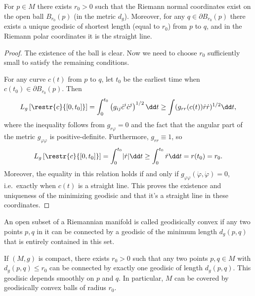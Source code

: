 \begin{cor}
    For $p\in M$ there exists $r_0>0$ such that the Riemann normal coordinates exist on the open ball $B_{r_0}(p)$ (in the metric $d_g$). Moreover, for any $q\in \partial B_{r_0}(p)$ there exists a unique geodisic of shortest length (equal to $r_0$) from $p$ to $q$, and in the Riemann polar coordinates it is the straight line.
\end{cor}
\begin{proof}
    The existence of the ball is clear. Now we need to choose $r_0$ sufficiently small to satisfy the remaining conditions.
    
    For any curve $c(t)$ from $p$ to $q$, let $t_0$ be the earliest time when $c(t_0)\in \partial B_{r_0}(p)$. Then
    \[L_g\left[\restr{c}{[0,t_0]}\right]=\int_0^{t_0} \left(g_{ij}\dot c^i\dot c^j\right)^{1/2}\dd t\geq \int (g_{rr}(c(t))\dot r\dot r)^{1/2}\dd t,\]
    where the inequality follows from $g_{r\varphi}=0$ and the fact that the angular part of the metric $g_{\varphi\varphi}$ is positive-definite. Furthermore, $g_{rr}\equiv1$, so
    \[L_g\left[\restr{c}{[0,t_0]}\right]=\int_0^{t_0}\lvert \dot r\rvert\dd t\geq \int_0^{t_0}\dot r\dd t=r(t_0)=r_0.\]
    Moreover, the equality in this relation holds if and only if $g_{\varphi\varphi}(\dot\varphi,\dot\varphi)=0$, i.e.\ exactly when $c(t)$ is a straight line. This proves the existence and uniqueness of the minimizing geodisic and that it's a straight line in these coordinates.
\end{proof}

\begin{defn}
    An open subset of a Riemannian manifold is called geodisically convex if any two points $p,q$ in it can be connected by a geodisic of the minimum length $d_g(p,q)$ that is entirely contained in this set.
\end{defn}

\begin{cor}
    If $(M,g)$ is compact, there exists $r_0>0$ such that any two points $p,q\in M$ with $d_g(p,q)\leq r_0$ can be connected by exactly one geodisic of length $d_g(p,q)$. This geodisic depends smoothly on $p$ and $q$. In particular, $M$ can be covered by geodisically convex balls of radius $r_0$.
\end{cor}


